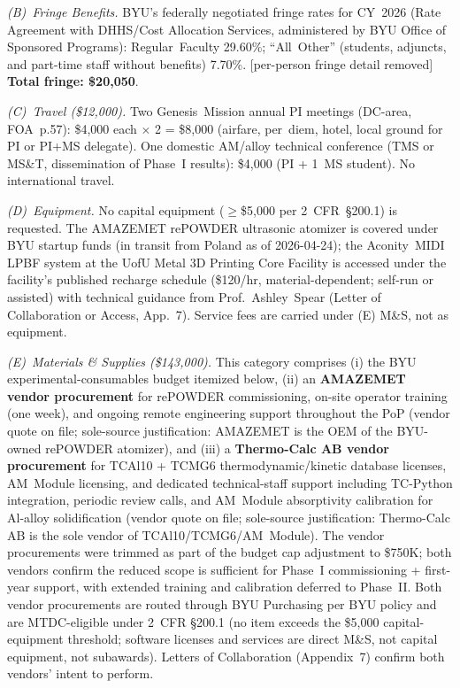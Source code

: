 \documentclass[11pt,letterpaper]{article}
\begin{document}
\textit{(B)~Fringe Benefits.}
BYU's federally negotiated fringe rates for CY~2026 (Rate Agreement with
DHHS/Cost Allocation Services, administered by BYU Office of Sponsored
Programs): Regular~Faculty 29.60\%; ``All~Other'' (students, adjuncts, and
part-time staff without benefits) 7.70\%.
[per-person fringe detail removed]
\textbf{Total fringe: \$20{,}050}.

\textit{(C)~Travel (\$12{,}000).}
Two Genesis~Mission annual PI meetings (DC-area, FOA~p.57): \$4{,}000 each
$\times$ 2 = \$8{,}000 (airfare, per~diem, hotel, local ground for PI or PI+MS
delegate).  One domestic AM/alloy technical conference (TMS or MS\&T,
dissemination of Phase~I results): \$4{,}000 (PI + 1~MS student).  No
international travel.

\textit{(D)~Equipment.}
No capital equipment ($\geq$\$5{,}000 per 2~CFR~\S200.1) is requested.  The
AMAZEMET rePOWDER ultrasonic atomizer is covered under BYU startup funds (in
transit from Poland as of 2026-04-24); the Aconity~MIDI LPBF system at the
UofU Metal 3D Printing Core Facility is accessed under the facility's
published recharge schedule (\$120/hr, material-dependent; self-run or
assisted) with technical guidance from Prof.\ Ashley~Spear (Letter of
Collaboration or Access, App.~7).  Service fees are carried under (E) M\&S,
not as equipment.

\textit{(E)~Materials \& Supplies (\$143{,}000).}
This category comprises (i) the BYU experimental-consumables
budget itemized below, (ii) an \textbf{AMAZEMET vendor procurement} for
rePOWDER commissioning, on-site operator training (one week), and ongoing
remote engineering support throughout the PoP (vendor quote on file; sole-source
justification: AMAZEMET is the OEM of the BYU-owned rePOWDER atomizer), and
(iii) a \textbf{Thermo-Calc AB vendor procurement} for TCAl10 +
TCMG6 thermodynamic/kinetic database licenses, AM~Module licensing, and
dedicated technical-staff support including TC-Python integration, periodic
review calls, and AM~Module absorptivity calibration for Al-alloy
solidification (vendor quote on file; sole-source justification: Thermo-Calc
AB is the sole vendor of TCAl10/TCMG6/AM~Module). The vendor procurements
were trimmed as part of the budget cap
adjustment to \$750K; both vendors confirm the reduced scope is sufficient
for Phase~I commissioning + first-year support, with extended training and
calibration deferred to Phase~II. Both vendor procurements
are routed through BYU Purchasing per BYU policy and are MTDC-eligible
under 2~CFR \S200.1 (no item exceeds the \$5{,}000 capital-equipment
threshold; software licenses and services are direct M\&S, not capital
equipment, not subawards). Letters of Collaboration (Appendix~7) confirm
both vendors' intent to perform.
\end{document}
